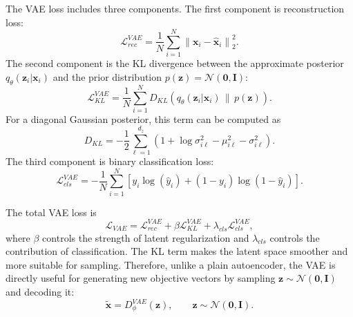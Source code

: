 The VAE loss includes three components. The first component is reconstruction loss:
\begin{equation}
    \mathcal{L}_{rec}^{VAE}
    =
    \frac{1}{N}
    \sum_{i=1}^{N}
    \left\|
        \mathbf{x}_i - \hat{\mathbf{x}}_i
    \right\|_2^2.
    \label{eq:vae_reconstruction_loss}
\end{equation}
The second component is the KL divergence between the approximate posterior $q_{\theta}(\mathbf{z}_i|\mathbf{x}_i)$ and the prior distribution $p(\mathbf{z})=\mathcal{N}(\mathbf{0},\mathbf{I})$:
\begin{equation}
    \mathcal{L}_{KL}^{VAE}
    =
    \frac{1}{N}
    \sum_{i=1}^{N}
    D_{KL}
    \left(
        q_{\theta}(\mathbf{z}_i|\mathbf{x}_i)
        \,\|\, 
        p(\mathbf{z})
    \right).
    \label{eq:vae_kl_loss}
\end{equation}
For a diagonal Gaussian posterior, this term can be computed as
\begin{equation}
    D_{KL}
    =
    -\frac{1}{2}
    \sum_{\ell=1}^{d_z}
    \left(
        1
        +
        \log \sigma_{i\ell}^{2}
        -
        \mu_{i\ell}^{2}
        -
        \sigma_{i\ell}^{2}
    \right).
    \label{eq:vae_kl_closed_form}
\end{equation}
The third component is binary classification loss:
\begin{equation}
    \mathcal{L}_{cls}^{VAE}
    =
    -\frac{1}{N}
    \sum_{i=1}^{N}
    \left[
        y_i \log(\hat{y}_i)
        +
        (1-y_i)\log(1-\hat{y}_i)
    \right].
    \label{eq:vae_classification_loss}
\end{equation}

The total VAE loss is
\begin{equation}
    \mathcal{L}_{VAE}
    =
    \mathcal{L}_{rec}^{VAE}
    +
    \beta \mathcal{L}_{KL}^{VAE}
    +
    \lambda_{cls}\mathcal{L}_{cls}^{VAE},
    \label{eq:vae_total_loss}
\end{equation}
where $\beta$ controls the strength of latent regularization and $\lambda_{cls}$ controls the contribution of classification. The KL term makes the latent space smoother and more suitable for sampling. Therefore, unlike a plain autoencoder, the VAE is directly useful for generating new objective vectors by sampling $\mathbf{z} \sim \mathcal{N}(\mathbf{0},\mathbf{I})$ and decoding it:
\begin{equation}
    \tilde{\mathbf{x}}
    =
    D_{\phi}^{VAE}(\mathbf{z}),
    \qquad
    \mathbf{z} \sim \mathcal{N}(\mathbf{0},\mathbf{I}).
    \label{eq:vae_generation}
\end{equation}

